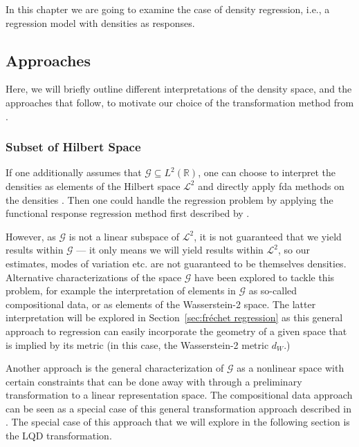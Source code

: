 In this chapter we are going to examine the case of density regression, i.e., a
regression model with densities as responses.

\subsection{Approaches}
\label{sec:approaches}
Here, we will briefly outline different interpretations of the density space, and the
approaches that follow, to motivate our choice of the transformation method from
\textcites{PetersenMüller2016}{KokoszkaEtAl2019}.

\subsubsection{Subset of Hilbert Space}
\label{sec:l2_interpretation}
If one additionally assumes that $\mathcal{G} \subseteq L^2(\mathbb{R})$, one can choose
to interpret the densities as elements of the Hilbert space $\mathcal{L}^2$ and directly
apply fda methods on the densities \parencite[see e.g.][]{KneipUtikal2001}. Then one
could handle the regression problem by applying the functional response regression method
first described by \textcite{Faraway1997}.

However, as $\mathcal{G}$ is not a linear subspace of $\mathcal{L}^2$, it is not guaranteed that
we yield results within $\mathcal{G}$ --- it only means we will yield results within $\mathcal{L}^2$,
so our estimates, modes of variation etc. are not guaranteed to be themselves densities.
Alternative characterizations of the space $\mathcal{G}$ have been explored to tackle
this problem, for example the interpretation of elements in $\mathcal{G}$ as so-called
compositional data, or as elements of the Wasserstein-2 space. The latter
interpretation will be explored in Section~\ref{sec:fréchet regression} as this general
approach to regression can easily incorporate the geometry of a given space that is
implied by its metric (in this case, the Wasserstein-2 metric $d_W$.)

Another approach is the general characterization of $\mathcal{G}$ as a nonlinear space
with certain constraints that can be done away with through a preliminary transformation
to a linear representation space. The compositional data approach can be seen as a
special case of this general transformation approach described in \textcite{PetersenMüller2016}.
The special case of this approach that we will explore in the following section is the
LQD transformation.

